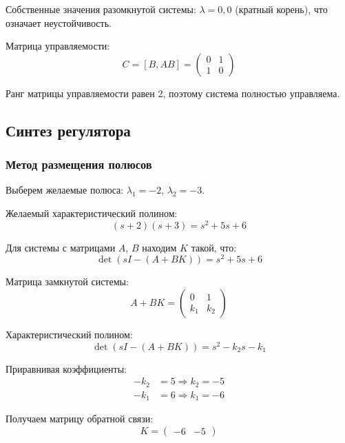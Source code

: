 Собственные значения разомкнутой системы: $\lambda = 0, 0$ (кратный корень), что означает неустойчивость.

Матрица управляемости:
\begin{equation}
C = [B, AB] = \begin{pmatrix} 0 & 1 \\ 1 & 0 \end{pmatrix}
\end{equation}

Ранг матрицы управляемости равен 2, поэтому система полностью управляема.

\subsection*{Синтез регулятора}

\subsubsection*{Метод размещения полюсов}

Выберем желаемые полюса: $\lambda_1 = -2$, $\lambda_2 = -3$.

Желаемый характеристический полином:
\begin{equation}
(s + 2)(s + 3) = s^2 + 5s + 6
\end{equation}

Для системы с матрицами $A$, $B$ находим $K$ такой, что:
\begin{equation}
\det(sI - (A + BK)) = s^2 + 5s + 6
\end{equation}

Матрица замкнутой системы:
\begin{equation}
A + BK = \begin{pmatrix} 0 & 1 \\ k_1 & k_2 \end{pmatrix}
\end{equation}

Характеристический полином:
\begin{equation}
\det(sI - (A + BK)) = s^2 - k_2s - k_1
\end{equation}

Приравнивая коэффициенты:
\begin{align}
-k_2 &= 5 \Rightarrow k_2 = -5 \\
-k_1 &= 6 \Rightarrow k_1 = -6
\end{align}

Получаем матрицу обратной связи:
\begin{equation}
K = \begin{pmatrix} -6 & -5 \end{pmatrix}
\end{equation}

